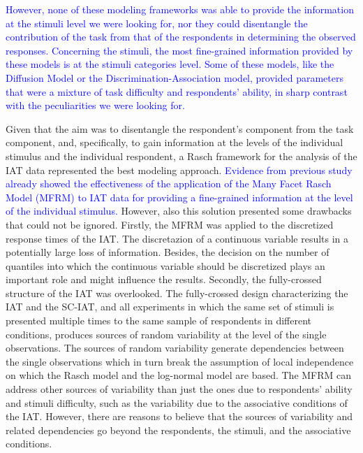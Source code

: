 \documentclass[12pt]{book}
\begin{document}
\textcolor{blue}{However, none of these modeling frameworks was able to provide the information at the stimuli level we were looking for, nor they could disentangle the contribution of the task from that of the respondents in determining the observed responses. 
	Concerning the stimuli, the most fine-grained information provided by these models is at the stimuli categories level. 
	Some of these models, like the Diffusion Model or the Discrimination-Association model, provided parameters that were a mixture of task difficulty and respondents' ability, in sharp contrast with the peculiarities we were looking for.}
 
Given that the aim was to disentangle the respondent's component from the task component, and, specifically, to gain information at the levels of the individual stimulus and the individual respondent, a Rasch framework for the analysis of the IAT data represented the best modeling approach. 
\textcolor{blue}{Evidence from previous study already showed the effectiveness of the application of the Many Facet Rasch Model (MFRM) to IAT data for providing a fine-grained information at the level of the individual stimulus.}
However, also this solution presented some drawbacks that could not be ignored. 
Firstly, the MFRM was applied to the discretized response times of the IAT. 
The discretazion of a continuous variable results in a potentially large loss of information. 
Besides, the decision on the number of quantiles into which the continuous variable should be discretized plays an important role and might influence the results. 
Secondly, the fully-crossed structure of the IAT was overlooked. 
The fully-crossed design characterizing the IAT and the SC-IAT, and all experiments in which the same set of stimuli is presented multiple times to the same sample of respondents in different conditions, produces sources of random variability at the level of the single observations. 
The sources of random variability generate dependencies between the single observations which in turn break the assumption of local independence on which the Rasch model and the log-normal model are based.  
The MFRM can address other sources of variability than just the ones due to respondents’ ability and stimuli difficulty, such as the variability due to the associative conditions of the IAT. 
However, there are reasons to believe that the sources of variability and related dependencies go beyond the respondents, the stimuli, and the associative conditions.
\end{document}
